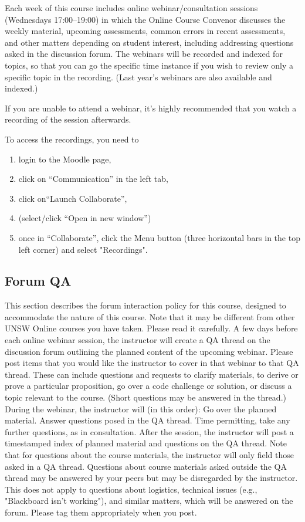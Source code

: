 \documentclass[11pt]{article}
\begin{document}
Each week of this course includes online webinar/consultation sessions (Wednesdays 17:00–19:00) in which the Online Course Convenor discusses the weekly material, upcoming assessments, common errors in recent assessments, and other matters depending on student interest, including addressing questions asked in the discussion forum.
The webinars will be recorded and indexed for topics, so that you can go the specific time instance if you wish to review only a specific topic in the recording. (Last year's webinars are also available and indexed.)

If you are unable to attend a webinar, it's highly recommended that you watch a recording of the session afterwards.

To access the recordings, you need to
\begin{enumerate}
  \item login to the Moodle page,
  \item click on ``Communication'' in the left tab,
  \item click on``Launch Collaborate'',
  \item (select/click ``Open in new window'')
  \item once in ``Collaborate'', click the Menu button (three horizontal bars in the top left corner) and select "Recordings".
\end{enumerate}

\subsection{Forum QA}\label{subsec:forum-qa}
This section describes the forum interaction policy for this course, designed to accommodate the nature of this course.
Note that it may be different from other UNSW Online courses you have taken.
Please read it carefully.
A few days before each online webinar session, the instructor will create a QA thread on the discussion forum outlining the planned content of the upcoming webinar.
Please post items that you would like the instructor to cover in that webinar to that QA thread.
These can include questions and requests to clarify materials, to derive or prove a particular proposition, go over a code challenge or solution, or discuss a topic relevant to the course.  (Short questions may be answered in the thread.)
During the webinar, the instructor will (in this order):
Go over the planned material.
Answer questions posed in the QA thread.
Time permitting, take any further questions, as in consultation.
After the session, the instructor will post a timestamped index of planned material and questions on the QA thread.
Note that for questions about the course materials, the instructor will only field those asked in a QA thread.
Questions about course materials asked outside the QA thread may be answered by your peers but may be disregarded by the instructor.
This does not apply to questions about logistics, technical issues (e.g., "Blackboard isn't working"), and similar matters, which will be answered on the forum.
Please tag them appropriately when you post.
\end{document}
